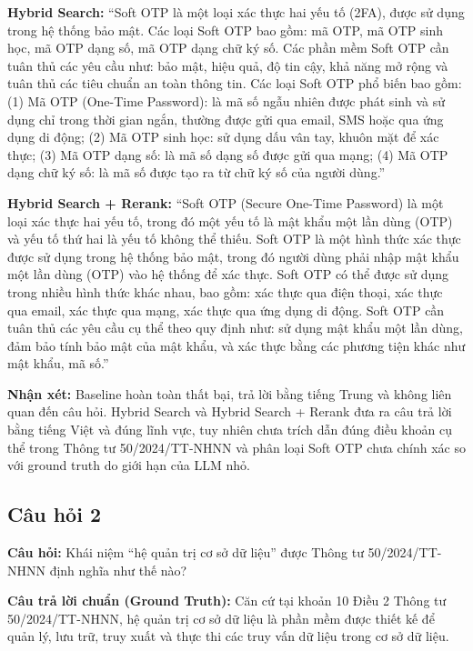 \textbf{Hybrid Search:} ``Soft OTP là một loại xác thực hai yếu tố (2FA), được sử dụng trong hệ thống bảo mật. Các loại Soft OTP bao gồm: mã OTP, mã OTP sinh học, mã OTP dạng số, mã OTP dạng chữ ký số. Các phần mềm Soft OTP cần tuân thủ các yêu cầu như: bảo mật, hiệu quả, độ tin cậy, khả năng mở rộng và tuân thủ các tiêu chuẩn an toàn thông tin. Các loại Soft OTP phổ biến bao gồm: (1) Mã OTP (One-Time Password): là mã số ngẫu nhiên được phát sinh và sử dụng chỉ trong thời gian ngắn, thường được gửi qua email, SMS hoặc qua ứng dụng di động; (2) Mã OTP sinh học: sử dụng dấu vân tay, khuôn mặt để xác thực; (3) Mã OTP dạng số: là mã số dạng số được gửi qua mạng; (4) Mã OTP dạng chữ ký số: là mã số được tạo ra từ chữ ký số của người dùng.''

\textbf{Hybrid Search + Rerank:} ``Soft OTP (Secure One-Time Password) là một loại xác thực hai yếu tố, trong đó một yếu tố là mật khẩu một lần dùng (OTP) và yếu tố thứ hai là yếu tố không thể thiếu. Soft OTP là một hình thức xác thực được sử dụng trong hệ thống bảo mật, trong đó người dùng phải nhập mật khẩu một lần dùng (OTP) vào hệ thống để xác thực. Soft OTP có thể được sử dụng trong nhiều hình thức khác nhau, bao gồm: xác thực qua điện thoại, xác thực qua email, xác thực qua mạng, xác thực qua ứng dụng di động. Soft OTP cần tuân thủ các yêu cầu cụ thể theo quy định như: sử dụng mật khẩu một lần dùng, đảm bảo tính bảo mật của mật khẩu, và xác thực bằng các phương tiện khác như mật khẩu, mã số.''

\textbf{Nhận xét:} Baseline hoàn toàn thất bại, trả lời bằng tiếng Trung và không liên quan đến câu hỏi. Hybrid Search và Hybrid Search + Rerank đưa ra câu trả lời bằng tiếng Việt và đúng lĩnh vực, tuy nhiên chưa trích dẫn đúng điều khoản cụ thể trong Thông tư 50/2024/TT-NHNN và phân loại Soft OTP chưa chính xác so với ground truth do giới hạn của LLM nhỏ.

\subsection*{Câu hỏi 2}

\textbf{Câu hỏi:} Khái niệm ``hệ quản trị cơ sở dữ liệu'' được Thông tư 50/2024/TT-NHNN định nghĩa như thế nào?

\textbf{Câu trả lời chuẩn (Ground Truth):} Căn cứ tại khoản 10 Điều 2 Thông tư 50/2024/TT-NHNN, hệ quản trị cơ sở dữ liệu là phần mềm được thiết kế để quản lý, lưu trữ, truy xuất và thực thi các truy vấn dữ liệu trong cơ sở dữ liệu.

